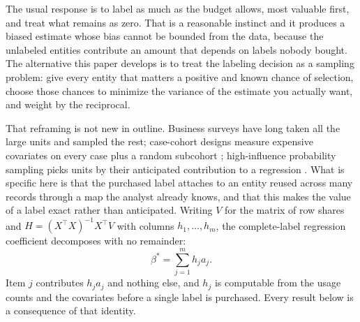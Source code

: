 \documentclass[11pt]{article}
\theoremstyle{plain}
\theoremstyle{remark}
\begin{document}
The usual response is to label as much as the budget allows, most valuable first, and treat what remains as zero. That is a reasonable instinct and it produces a biased estimate whose bias cannot be bounded from the data, because the unlabeled entities contribute an amount that depends on labels nobody bought. The alternative this paper develops is to treat the labeling decision as a sampling problem: give every entity that matters a positive and known chance of selection, choose those chances to minimize the variance of the estimate you actually want, and weight by the reciprocal.

That reframing is not new in outline. Business surveys have long taken all the large units and sampled the rest; case-cohort designs measure expensive covariates on every case plus a random subcohort \citep{Prentice1986}; high-influence probability sampling picks units by their anticipated contribution to a regression \citep{Clark2022}. What is specific here is that the purchased label attaches to an entity reused across many records through a map the analyst already knows, and that this makes the value of a label exact rather than anticipated. Writing $V$ for the matrix of row shares and $H=(X^\top X)^{-1}X^\top V$ with columns $h_1,\dots,h_m$, the complete-label regression coefficient decomposes with no remainder:
\[
\beta^*=\sum_{j=1}^m h_j a_j .
\]
Item $j$ contributes $h_j a_j$ and nothing else, and $h_j$ is computable from the usage counts and the covariates before a single label is purchased. Every result below is a consequence of that identity.
\end{document}
